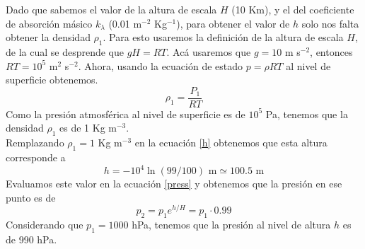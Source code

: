 \documentclass{tarea}
\begin{document}
Dado que sabemos el valor de la altura de escala $H$ (10 Km), y el del coeficiente de absorción másico $k_\lambda$ (0.01 m$^{-2}$ Kg$^{-1}$), para obtener el valor de $h$ solo nos falta obtener la densidad $\rho_1$. Para esto usaremos la definición de la altura de escala $H$, de la cual se desprende que $gH = RT$. Acá usaremos que $g = 10$ m s$ ^{-2}$, entonces $RT = 10^{5}$ m$^{2}$ s$^{-2}$. Ahora, usando la ecuación de estado $p = \rho RT$ al nivel de superficie obtenemos.
\begin{equation}
    \rho_1 = \frac{P_1}{RT}
\end{equation}
Como la presión atmosférica al nivel de superficie es de $10^{5}$ Pa, tenemos que la densidad $\rho_1$ es de 1 Kg m$^{-3}$.\\

Remplazando $\rho_1 = 1$ Kg m$^{-3}$ en la ecuación \eqref{h} obtenemos que esta altura corresponde a $$ h = -10^{4} \ln \left( 99/100 \right) \text{ m} \simeq 100.5 \text{ m} $$
Evaluamos este valor en la ecuación \eqref{press} y obtenemos que la presión en ese punto es de 
$$p_2 = p_1 e^{h/H} = p_1 \cdot 0.99 $$
Considerando que $p_1 = 1000$ hPa, tenemos que la presión al nivel de altura $h$ es de 990 hPa.
\end{document}
